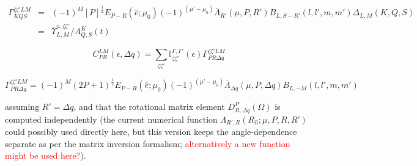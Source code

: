 \begin{eqnarray}
\Gamma_{KQS}^{\zeta\zeta'LM} & = & (-1)^{M}[P]^{\frac{1}{2}}E_{P-R}(\hat{e};\mu_{0})(-1)^{(\mu'-\mu_{0})}\bar{\Lambda}_{R'}(\mu,P,R')B_{L,S-R'}(l,l',m,m')\Delta_{L,M}(K,Q,S)\\
 & = & \bar{\varUpsilon}_{L,M}^{u,\zeta\zeta'}/A_{Q,S}^{K}(t)
\end{eqnarray}

\begin{equation}
C_{PR}^{LM}(\epsilon,\Delta q)=\sum_{\zeta\zeta'}\mathbb{I}_{\zeta\zeta'}^{\Gamma,\Gamma'}(\epsilon)\Gamma_{PR\Delta q}^{\zeta\zeta'LM}
\end{equation}

\begin{equation}
\Gamma_{PR\Delta q}^{\zeta\zeta'LM}=(-1)^{M}(2P+1)^{\frac{1}{2}}E_{P-R}(\hat{e};\mu_{0})(-1)^{(\mu'-\mu_{0})}\bar{\Lambda}_{\Delta q}(\mu,P,\Delta q)B_{L,-M}(l,l',m,m')
\end{equation}

assuming $R'=\Delta q$, and that the rotational matrix element $D_{R,\Delta q}^{P}(\Omega)$
is computed independently (the current numerical function $\Lambda_{R',R}(R_{\hat{n}};\mu,P,R,R')$
could possibly used directly here, but this version keeps the angle-dependence
separate as per the matrix inversion formalism; \textcolor{red}{alternatively
a new function might be used here?}).